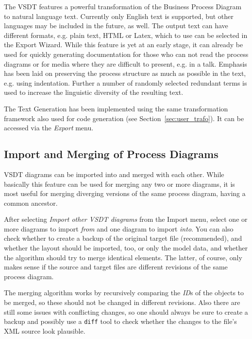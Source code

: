 The VSDT features a powerful transformation of the Business Process Diagram to
natural language text.  Currently only English text is supported, but other
languages may be included in the future, as well.  The output text can have
different formats, e.g. plain text, HTML or Latex, which to use can be selected
in the Export Wizard.  While this feature is yet at an early stage, it can already
be used for quickly generating documentation for those who can not read the
process diagrams or for media where they are difficult to present, e.g. in a talk.
Emphasis has been laid on preserving the process structure as much as possible in
the text, e.g. using indentation.  Further a number of randomly selected redundant
terms is used to increase the linguistic diversity of the resulting text.

The Text Generation has been implemented using the same transformation framework
also used for code generation (see Section~\ref{sec:user_trafo}).  It can be
accessed via the \emph{Export} menu.



\subsection{Import and Merging of Process Diagrams}

VSDT diagrams can be imported into and merged with each other.  While basically
this feature can be used for merging any two or more diagrams, it is most useful
for merging diverging versions of the same process diagram, having a common
ancestor.

After selecting \emph{Import other VSDT diagrams} from the Import menu, select
one or more diagrams to import \emph{from} and one diagram to import \emph{into}.
You can also check whether to create a backup of the original target file
(recommended), and whether the layout should be imported, too, or only the model
data, and whether the algorithm should try to merge identical elements.  The
latter, of course, only makes sense if the source and target files are different
revisions of the same process diagram.

The merging algorithm works by recursively comparing the \emph{ID}s of the objects
to be merged, so these should not be changed in different revisions.  Also there
are still some issues with conflicting changes, so one should always be sure to
create a backup and possibly use a \texttt{diff} tool to check whether the changes
to the file's XML source look plausible.


